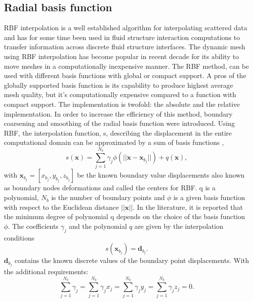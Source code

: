 \documentclass[10pt,a4paper,twoside]{article}
\begin{document}
\subsection{Radial basis function}
	
	RBF interpolation is a well established algorithm for interpolating scattered data and has for some time been used in fluid structure interaction computations to transfer information across discrete fluid structure interfaces. The dynamic mesh using RBF interpolation has become popular in recent decade for its ability to move meshes in a computationally inexpensive manner. The RBF method, can be used with different basis functions with global or compact support. A pros of the globally supported basis function is its capability to produce highest average mesh quality, but it's computationally expensive compared to a function with compact support. The implementation is twofold: the absolute and the relative implementation. In order
	to increase the efficiency of this method,
	boundary coarsening and smoothing of the radial basis function were introduced. 
	Using RBF, the interpolation function, s, describing the displacement in the entire computational domain can be approximated by a sum of basis functions \cite{selim2017finite},
	\begin{equation}
	s(\boldsymbol{x}) = \displaystyle\sum_{j=1}^{N_b}\gamma_j\phi(||\boldsymbol{x}- \boldsymbol{x}_{b_j}||) + q(\boldsymbol{x}),
	\end{equation}
	with $\boldsymbol{x}_{b_j} = [x_{b_j}, y_{b_j}, z_{b_j}]$ be the known boundary value displacements also known as boundary nodes deformations and called the centers for RBF. q is a polynomial, $N_b$ is the number of boundary points and $\phi$ is a given basis function with respect to the Euclidean distance $|| \boldsymbol{x}||.$ In the literature, it is reported that the minimum degree of polynomial q depends on the choice of the basis function $\phi$. The coefficients $\gamma_j$ and the polynomial $q$ are given by the interpolation conditions
	\begin{equation}
	s(\boldsymbol{x}_{b_j}) = \boldsymbol{d}_{b_j}.
	\end{equation}
	$\boldsymbol{d}_{b_j}$ contains the known discrete values of the boundary point displacements. With the additional requirements:
	\begin{equation}
	\displaystyle\sum_{j=1}^{N_b}\gamma_j = \displaystyle\sum_{j=1}^{N_b}\gamma_jx_j = \displaystyle\sum_{j=1}^{N_b}\gamma_jy_j = \displaystyle\sum_{j=1}^{N_b}\gamma_jz_j = 0.
	\end{equation}
\end{document}
